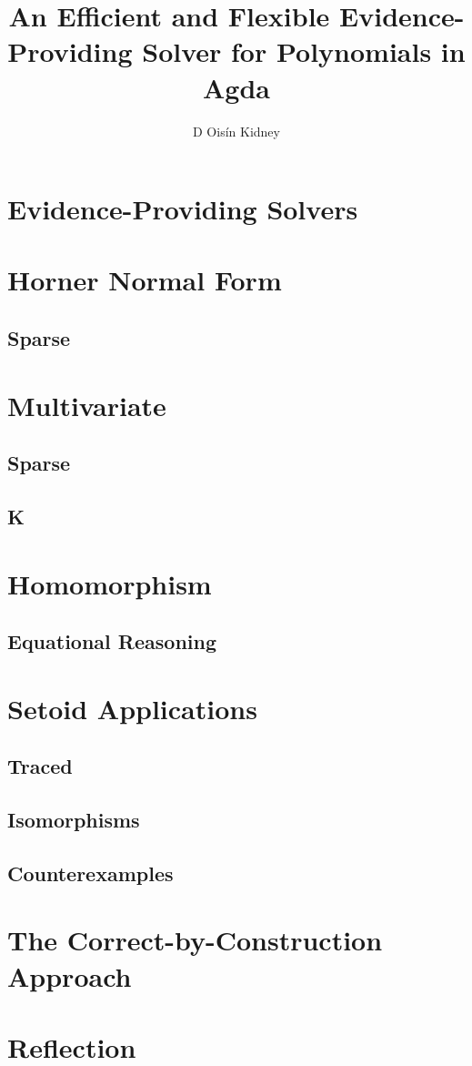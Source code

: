 \documentclass[draft]{article}
\author{D Oisín Kidney}
\title{An Efficient and Flexible Evidence-Providing Solver for Polynomials in Agda}
\begin{document}
\section{Evidence-Providing Solvers}
\section{Horner Normal Form}
\subsection{Sparse}
\section{Multivariate}
\subsection{Sparse}
\subsection{K}
\section{Homomorphism}
\subsection{Equational Reasoning}
\section{Setoid Applications}
\subsection{Traced}
\subsection{Isomorphisms}
\subsection{Counterexamples}
\section{The Correct-by-Construction Approach}
\section{Reflection}
\end{document}
